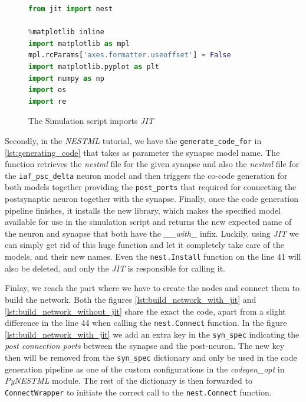 \begin{figure}[ht!]
\centering
\begin{lstlisting}[language=Python, label=lst:imports_with_jit, caption={The Simulation script imports with JIT}]
from jit import nest

%matplotlib inline
import matplotlib as mpl
mpl.rcParams['axes.formatter.useoffset'] = False
import matplotlib.pyplot as plt
import numpy as np
import os
import re
\end{lstlisting}
\caption{The Simulation script imports \emph{JIT}}
\end{figure}

Secondly, in the \emph{NESTML} tutorial, we have the \texttt{generate\_code\_for} in \autoref{lst:generating_code} that takes as parameter the synapse model name. The function retrieves the \emph{nestml} file for the given synapse and also the \emph{nestml} file for the \texttt{iaf\_psc\_delta} neuron model and then triggers the co-code generation for both models together providing the \texttt{post\_ports} that required for connecting the postsynaptic neuron together with the synapse. Finally, once the code generation pipeline finishes, it installs the new library, which makes the specified model available for use in the simulation script and returns the new expected name of the neuron and synapse that both have the \emph{\_\_with\_} infix. Luckily, using \emph{JIT} we can simply get rid of this huge function and let it completely take care of the models, and their new names. Even the \texttt{nest.Install} function on the line 41 will also be deleted, and only the \emph{JIT} is responsible for calling it.



Finlay, we reach the part where we have to create the nodes and connect them to build the network. Both the figures \autoref{lst:build_network_with_jit} and \autoref{lst:build_network_without_jit} share the exact the code, apart from a slight difference in the line 44 when calling the \texttt{nest.Connect} function. In the figure \autoref{lst:build_network_with_jit} we add an extra key in the \texttt{syn\_spec} indicating the \emph{post connection ports} between the synapse and the post-neuron. The new key then will be removed from the \texttt{syn\_spec} dictionary and only be used in the code generation pipeline as one of the custom configurations in the \emph{codegen\_opt} in \emph{PyNESTML} module. The rest of the dictionary is then forwarded to \texttt{ConnectWrapper} to initiate the correct call to the \texttt{nest.Connect} function.

